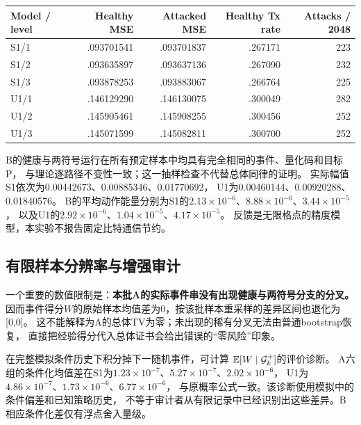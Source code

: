 \begin{table}[ht]
\centering\footnotesize
{}
\label{tab:e1-health}
\begin{tabular}{lrrrr}
\toprule
Model / level & Healthy MSE & Attacked MSE & Healthy Tx rate & Attacks / 2048\\
\midrule
S1/1 & .093701541 & .093701837 & .267171 & 223\\
S1/2 & .093635897 & .093637136 & .267090 & 232\\
S1/3 & .093878253 & .093883067 & .266764 & 225\\
U1/1 & .146129290 & .146130075 & .300049 & 282\\
U1/2 & .145905461 & .145908255 & .300456 & 252\\
U1/3 & .145071599 & .145082811 & .300700 & 252\\
\bottomrule
\end{tabular}
\end{table}
B的健康与两符号运行在所有预定样本中均具有完全相同的事件、量化码和目标P，
与理论逐路径不变性一致；这一抽样检查不代替总体同律的证明。
实际幅值S1依次为0.00442673、0.00885346、0.01770692，
U1为0.00460144、0.00920288、0.01840576。
B的平均动作能量分别为S1的$2.13\times10^{-6}$、$8.88\times10^{-6}$、$3.44\times10^{-5}$，
以及U1的$2.92\times10^{-6}$、$1.04\times10^{-5}$、$4.17\times10^{-5}$。
反馈是无限格点的精度模型，本实验不报告固定比特通信节约。

\subsection{有限样本分辨率与增强审计}
一个重要的数值限制是：\textbf{本批A的实际事件串没有出现健康与两符号分支的分叉。}
因而事件得分$W$的原始样本均值差为0，按该批样本重采样的差异区间也退化为[0,0]。
这不能解释为A的总体TV为零；未出现的稀有分叉无法由普通bootstrap恢复，
直接把经验得分代入总体证书会给出错误的“零风险”印象。

在完整模拟条件历史下积分掉下一随机事件，可计算
$\mathbb E[W\mid\mathcal G_k^+]$的评价诊断。
A六组的条件化均值差在S1为$1.23\times10^{-7}$、$5.27\times10^{-7}$、$2.02\times10^{-6}$，
U1为$4.86\times10^{-7}$、$1.73\times10^{-6}$、$6.77\times10^{-6}$，
与原概率公式一致。该诊断使用模拟中的条件偏差和已知策略历史，
不等于审计者从有限记录中已经识别出这些差异。B相应条件化差仅有浮点舍入量级。

